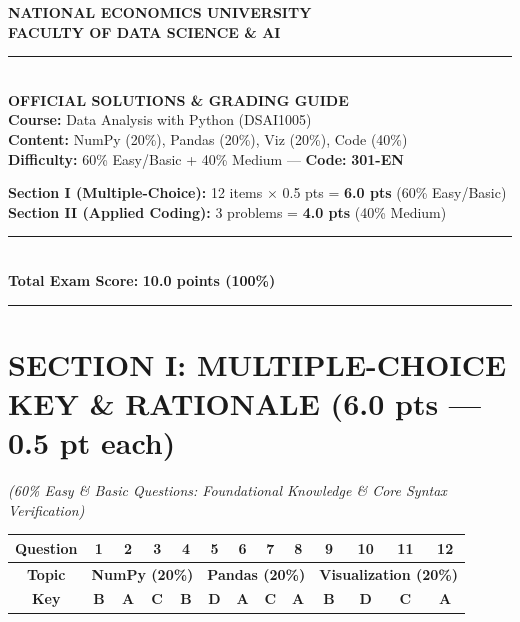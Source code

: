 \documentclass[11pt,a4paper]{article}
\begin{document}
\noindent
\begin{minipage}[t]{0.55\textwidth}
  \centering
  \textbf{NATIONAL ECONOMICS UNIVERSITY}\\
  \textbf{FACULTY OF DATA SCIENCE \& AI}\\
  \rule{4.5cm}{0.4pt}\\[2mm]
  \textbf{OFFICIAL SOLUTIONS \& GRADING GUIDE}\\
  \textbf{Course:} Data Analysis with Python (DSAI1005)\\
  \textbf{Content:} NumPy (20\%), Pandas (20\%), Viz (20\%), Code (40\%)\\
  \textbf{Difficulty:} 60\% Easy/Basic + 40\% Medium --- \textbf{Code:} \textbf{301-EN}
\end{minipage}
\hfill
\begin{minipage}[t]{0.42\textwidth}
  \begin{tcolorbox}[colback=blue!5!white,colframe=blue!75!black,title=\textbf{Score Breakdown (10-Point Scale)}]
    \small
    \textbf{Section I (Multiple-Choice):} 12 items $\times$ 0.5 pts = \textbf{6.0 pts} (60\% Easy/Basic)\\
    \textbf{Section II (Applied Coding):} 3 problems = \textbf{4.0 pts} (40\% Medium)\\
    \rule{\linewidth}{0.3pt}\\
    \textbf{Total Exam Score:} \textbf{10.0 points (100\%)}
  \end{tcolorbox}
\end{minipage}

\vspace{3mm}
\hrule
\vspace{2mm}

\section*{SECTION I: MULTIPLE-CHOICE KEY \& RATIONALE (6.0 pts --- 0.5 pt each)}
\textit{\small (60\% Easy \& Basic Questions: Foundational Knowledge \& Core Syntax Verification)}

\begin{center}
\renewcommand{\arraystretch}{1.3}
\begin{tabular}{|c|c|c|c|c|c|c|c|c|c|c|c|c|}
  \hline
  \textbf{Question} & \textbf{1} & \textbf{2} & \textbf{3} & \textbf{4} & \textbf{5} & \textbf{6} & \textbf{7} & \textbf{8} & \textbf{9} & \textbf{10} & \textbf{11} & \textbf{12} \\
  \hline
  \textbf{Topic} & \multicolumn{4}{c|}{\textbf{NumPy (20\%)}} & \multicolumn{4}{c|}{\textbf{Pandas (20\%)}} & \multicolumn{4}{c|}{\textbf{Visualization (20\%)}} \\
  \hline
  \textbf{Key} & \textbf{B} & \textbf{A} & \textbf{C} & \textbf{B} & \textbf{D} & \textbf{A} & \textbf{C} & \textbf{A} & \textbf{B} & \textbf{D} & \textbf{C} & \textbf{A} \\
  \hline
\end{tabular}
\end{center}
\end{document}
